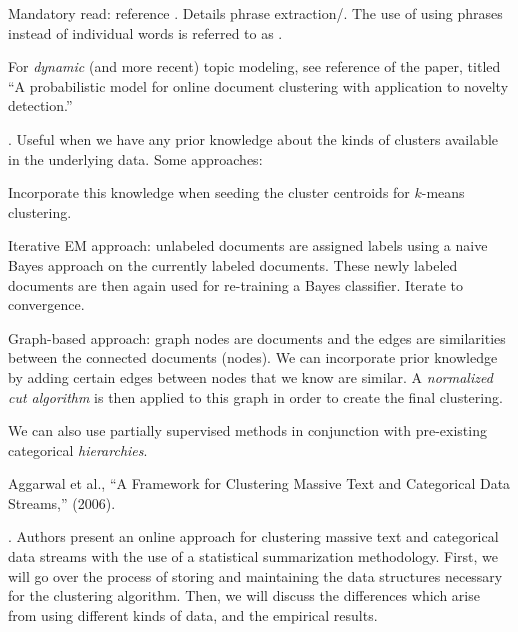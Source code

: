 \documentclass[11pt]{article}
\begin{document}
\myspace
\p {}
\begin{compactitem}
	\item Mandatory read: reference . Details phrase extraction/. The use of using phrases instead of individual words is referred to as . 
	\item For \textit{dynamic} (and more recent) topic modeling, see reference  of the paper, titled ``A probabilistic model for online document clustering with application to novelty detection.''
\end{compactitem}


\myspace
\p {}. Useful when we have any prior knowledge about the kinds of clusters available in the underlying data. Some approaches:
\begin{compactitem}
	\item Incorporate this knowledge when seeding the cluster centroids for $k$-means clustering. 
	
	\item Iterative EM approach: unlabeled documents are assigned labels using a naive Bayes approach on the currently labeled documents. These newly labeled documents are then again used for re-training a Bayes
	classifier. Iterate to convergence.
	
	\item Graph-based approach: graph nodes are documents and the edges are similarities between the connected documents (nodes). We can incorporate prior knowledge by adding certain edges between nodes that we know are similar. A \textit{normalized cut algorithm} is then applied to this graph in order to create the final clustering.
\end{compactitem}
We can also use partially supervised methods in conjunction with pre-existing categorical \textit{hierarchies}. 






\vspace{-1em}
{\footnotesize Aggarwal et al., ``A Framework for Clustering Massive Text and Categorical Data
	Streams,'' (2006).}

\p {}. Authors present an online approach for clustering massive text and categorical data streams with the use of a statistical summarization methodology. First, we will go over the process of storing and maintaining the data structures necessary for the clustering algorithm. Then, we will discuss the differences which arise from using different kinds of data, and the empirical results.
\end{document}

